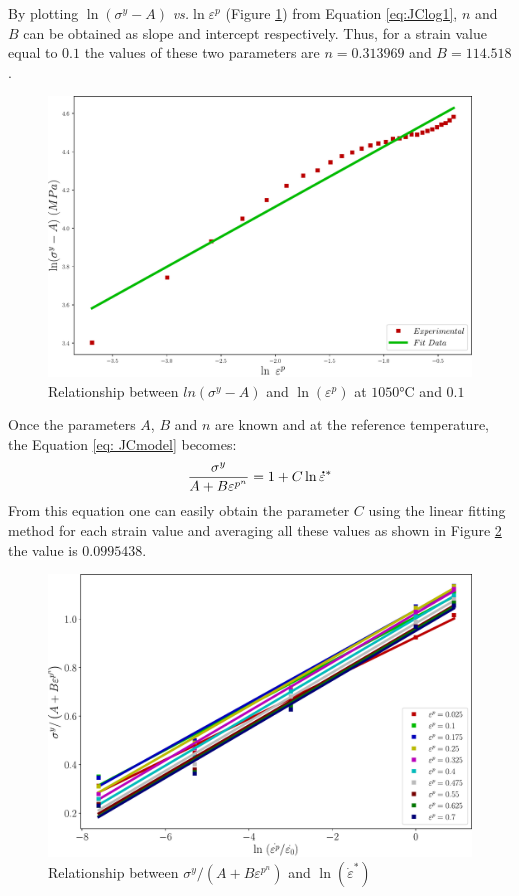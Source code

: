 \documentclass[twoside,english,1p,final,sort&compress]{elsarticle}
\makeatletter
\theoremstyle{plain}
\newcommand{\mdot}[1]{\accentset{\mbox{\bfseries .}}{#1}}
\newcommand*{\versus}{\emph{vs.}\@\xspace}
\makeatother
\begin{document}
By plotting $\ln(\sigma^y-A)$ \versus $\ln\varepsilon^p$ (Figure \ref{fig:JCSigmaAB}) from Equation \ref{eq:JClog1}, $n$ and $B$ can be obtained as slope and intercept respectively. Thus, for a strain value equal to $0.1$ the values of these two parameters are $n=0.313969$ and $B=114.518$.
\begin{figure}[!ht]
\centering
\includegraphics[width=0.9\columnwidth]
{Figures/JCSigmaAB}
\caption{Relationship between $ln(\sigma^y -A)$ and $\ln(\varepsilon^p)$ at $1050$°C and $0.1$}
\label{fig:JCSigmaAB}
\end{figure}
\FloatBarrier
Once the parameters $A$, $B$ and $n$ are known and at the reference temperature, the Equation \ref{eq: JCmodel} becomes:
\begin{equation}
\frac{\sigma^y}{A + B\varepsilon^{p^n}} = 1 + C\ln\mdot\varepsilon^*
\end{equation}
From this equation one can easily obtain the parameter $C$ using the linear fitting method for each strain value and averaging all these values as shown in Figure \ref{fig:JCSigmaAB1} the value is $0.0995438$.
\begin{figure}[!ht]
\centering
\includegraphics[width=0.9\columnwidth]
{Figures/JCSigmaAB1}
\caption{Relationship between $\sigma^y/(A+ B\varepsilon^{p^n})$ and $\ln(\dot{\varepsilon}^*)$}
\label{fig:JCSigmaAB1}
\end{figure}
\end{document}
